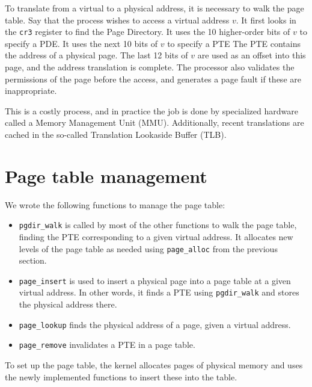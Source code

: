 \documentclass{report}
\begin{document}
To translate from a virtual to a physical address, it is necessary to walk the
page table. Say that the process wishes to access a virtual address $v$. It
first looks in the \texttt{cr3} register to find the Page Directory. It uses the
10 higher-order bits of $v$ to specify a PDE. It uses the next 10 bits
of $v$ to specify a PTE The PTE contains the address of a
physical page. The last 12 bits of $v$ are used as an offset into this page,
and the address translation is complete. The processor also validates the
permissions of the page before the access, and generates a page fault if these
are inappropriate.

This is a costly process, and in practice the job is done by specialized
hardware called a Memory Management Unit (MMU). Additionally, recent
translations are cached in the so-called Translation Lookaside Buffer
(TLB).


\section{Page table management}
\label{sec:pagetables}
We wrote the following functions to manage the page table:
\begin{itemize}
\item \texttt{pgdir\_walk} is called by most of the other functions to walk the
page table, finding the PTE corresponding to a given virtual address. It
allocates new levels of the page table as needed using \texttt{page\_alloc}
from the previous section.
\item \texttt{page\_insert} is used to insert a physical page into a page
table at a given virtual address. In other words, it finds a PTE using
\texttt{pgdir\_walk} and stores the physical address there.
\item \texttt{page\_lookup} finds the physical address of a page, given a
virtual address.
\item \texttt{page\_remove} invalidates a PTE in a page table.
\end{itemize}
To set up the page table, the kernel allocates pages of physical memory and
uses the newly implemented functions to insert these into the table.
\end{document}
